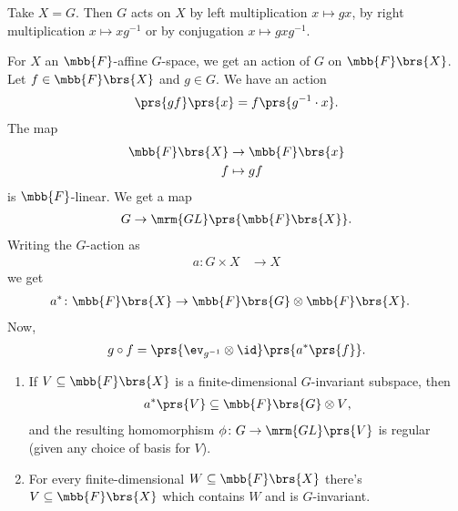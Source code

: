 \documentclass[10pt,a4paper,twoside,openany,hidelinks]{book}
\begin{document}
\begin{example}
Take $X = G$. Then $G$ acts on $X$ by left multiplication $x \mapsto gx$, by right multiplication $x \mapsto x g^{-1}$ or by conjugation $x \mapsto gxg^{-1}$.
\end{example}

For $X$ an $\mbb{F}$-affine $G$-space, we get an action of $G$ on $\mbb{F}\brs{X}$.
Let $f \in \mbb{F}\brs{X}$ and $g \in G$. We have an action
\begin{align*}
\prs{gf} \prs{x} = f\prs{g^{-1} \cdot x} \text{.}
\end{align*}
The map
\begin{align*}
\mbb{F}\brs{X} &\to \mbb{F}\brs{x} \\
f &\mapsto gf
\end{align*}
is $\mbb{F}$-linear.
We get a map
\begin{align*}
G \to \mrm{GL}\prs{\mbb{F}\brs{X}} \text{.}
\end{align*}
Writing the $G$-action as
\begin{align*}
a \colon G \times X &\to X
\end{align*}
we get
\begin{align*}
a^* \colon \mbb{F}\brs{X} &\to \mbb{F}\brs{G} \otimes \mbb{F}\brs{X} \text{.}
\end{align*}
Now,
\begin{align*}
g \circ f = \prs{\ev_{g^{-1}} \otimes \id}\prs{a^*\prs{f}} \text{.}
\end{align*}

\begin{proposition}\label{proposition:embedding_lemma}
\begin{enumerate}
\item If $V \subseteq \mbb{F}\brs{X}$ is a finite-dimensional $G$-invariant subspace, then
\begin{align*}
a^*\prs{V} \subseteq \mbb{F}\brs{G} \otimes V \text{,}
\end{align*}
and the resulting homomorphism $\phi \colon G \to \mrm{GL}\prs{V}$ is regular (given any choice of basis for $V$).

\item For every finite-dimensional $W \subseteq \mbb{F}\brs{X}$ there's $V \subseteq \mbb{F}\brs{X}$ which contains $W$ and is $G$-invariant.
\end{enumerate}
\end{proposition}
\end{document}
